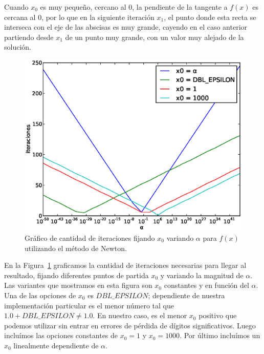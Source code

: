 Cuando $x_0$ es muy pequeño, cercano al $0$, la pendiente de la tangente a
$f(x)$ es cercana al 0, por lo que en la siguiente iteración $x_1$, el punto donde
esta recta se interseca con el eje de las abscisas es muy grande, cayendo en el
caso anterior partiendo desde $x_1$ de un punto muy grande, con un valor muy
alejado de la solución.

\begin{figure}[!htbp]
  \begin{center}
    \includegraphics[scale=0.5]{graficos/new/f_newton_x0_fijo_1.eps}
    \caption{\label{fig:f_newton_x0_fijo_1} Gráfico de cantidad de iteraciones fijando $x_0$ variando $\alpha$ para $f(x)$ utilizando el método de Newton.}
  \end{center}
\end{figure}

En la Figura~\ref{fig:f_newton_x0_fijo_1} graficamos la cantidad de iteraciones
necesarias para llegar al resultado, fijando diferentes puntos de partida $x_0$
y variando la magnitud de $\alpha$. Las variantes que mostramos en esta figura
son $x_0$ constantes y en función del $\alpha$. Una de las opciones de $x_0$ es
$\textit{DBL\_EPSILON}$; dependiente de nuestra implementación particular es el
menor número tal que $1.0 + \textit{DBL\_EPSILON} \ne 1.0$. En nuestro caso, es
el menor $x_0$ positivo que podemos utilizar sin entrar en errores de pérdida
de dígitos significativos. Luego incluímos las opciones constantes de $x_0 = 1$
y $x_0 = 1000$. Por último incluímos un $x_0$ linealmente dependiente de $\alpha$.\\


